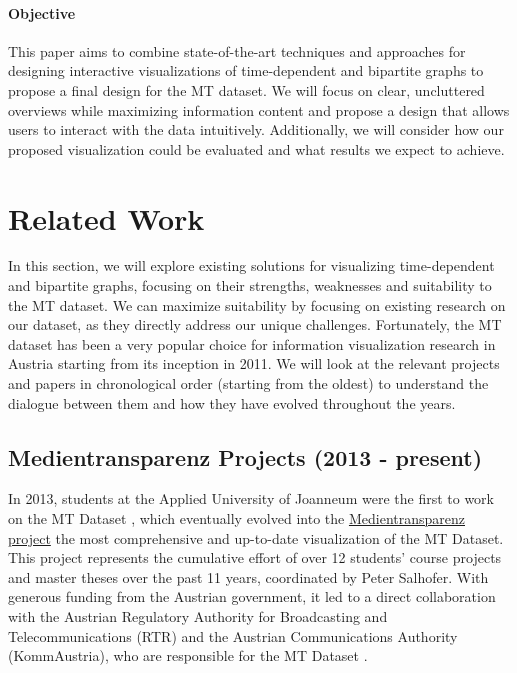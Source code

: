 \documentclass{vgtc}
\begin{document}
\paragraph{Objective} This paper aims to combine state-of-the-art techniques and approaches for designing interactive visualizations of time-dependent and bipartite graphs to propose a final design for the MT dataset. We will focus on clear, uncluttered overviews while maximizing information content and propose a design that allows users to interact with the data intuitively. Additionally, we will consider how our proposed visualization could be evaluated and what results we expect to achieve.

\section{Related Work} %

In this section, we will explore existing solutions for visualizing time-dependent and bipartite graphs, focusing on their strengths, weaknesses and suitability to the MT dataset.
We can maximize suitability by focusing on existing research on our dataset, as they directly address our unique challenges. Fortunately, the MT dataset has been a very popular choice for information visualization research in Austria starting from its inception in 2011. We will look at the relevant projects and papers in chronological order (starting from the oldest) to understand the dialogue between them and how they have evolved throughout the years.

\subsection{Medientransparenz Projects (2013 - present)}

In 2013, students at the Applied University of Joanneum were the first to work on the MT Dataset \cite{medtrans}, which eventually evolved into the \href{https://visualisierung.medientransparenz.rtr.at/}{Medientransparenz project} \textendash{} the most comprehensive and up-to-date visualization of the MT Dataset. This project represents the cumulative effort of over 12 students' course projects and master theses over the past 11 years, coordinated by Peter Salhofer. With generous funding from the Austrian government, it led to a direct collaboration with the Austrian Regulatory Authority for Broadcasting and Telecommunications (RTR) and the Austrian Communications Authority (KommAustria), who are responsible for the MT Dataset \cite{dataset}.
\end{document}
